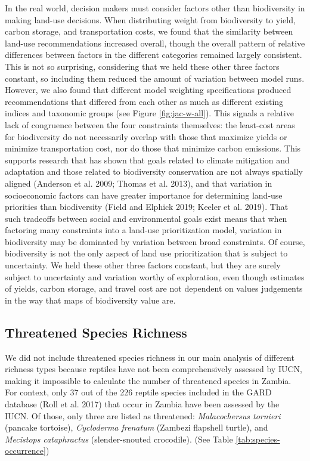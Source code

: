 \documentclass[
]{article}
\begin{document}
In the real world, decision makers must consider factors other than biodiversity in making land-use decisions. When distributing weight from biodiversity to yield, carbon storage, and transportation costs, we found that the similarity between land-use recommendations increased overall, though the overall pattern of relative differences between factors in the different categories remained largely consistent. This is not so surprising, considering that we held these other three factors constant, so including them reduced the amount of variation between model runs. However, we also found that different model weighting specifications produced recommendations that differed from each other as much as different existing indices and taxonomic groups (see Figure \ref{fig:jac-w-all}). This signals a relative lack of congruence between the four constraints themselves: the least-cost areas for biodiversity do not necessarily overlap with those that maximize yields or minimize transportation cost, nor do those that minimize carbon emissions. This supports research that has shown that goals related to climate mitigation and adaptation and those related to biodiversity conservation are not always spatially aligned (Anderson et al. 2009; Thomas et al. 2013), and that variation in socioeconomic factors can have greater importance for determining land-use priorities than biodiversity (Field and Elphick 2019; Keeler et al. 2019). That such tradeoffs between social and environmental goals exist means that when factoring many constraints into a land-use prioritization model, variation in biodiversity may be dominated by variation between broad constraints. Of course, biodiversity is not the only aspect of land use prioritization that is subject to uncertainty. We held these other three factors constant, but they are surely subject to uncertainty and variation worthy of exploration, even though estimates of yields, carbon storage, and travel cost are not dependent on values judgements in the way that maps of biodiversity value are.

\hypertarget{section-threat}{%
\subsection{Threatened Species Richness}\label{section-threat}}

We did not include threatened species richness in our main analysis of different richness types because reptiles have not been comprehensively assessed by IUCN, making it impossible to calculate the number of threatened species in Zambia. For context, only 37 out of the 226 reptile species included in the GARD database (Roll et al. 2017) that occur in Zambia have been assessed by the IUCN. Of those, only three are listed as threatened: \emph{Malacochersus tornieri} (pancake tortoise), \emph{Cycloderma frenatum} (Zambezi flapshell turtle), and \emph{Mecistops cataphractus} (slender-snouted crocodile). (See Table \ref{tab:species-occurrence})
\end{document}
